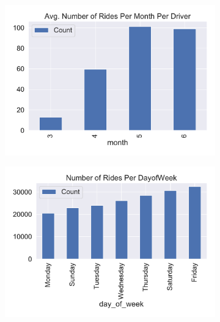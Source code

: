 \documentclass{report}
\begin{document}
			\begin{figure}[!htb]
				\centering
				\begin{subfigure}[t]{0.32\textwidth}
					\includegraphics[width=\linewidth]{timefactor_analysis/avg_number_rides_per_monthdriver.pdf}
					\caption{}
				\end{subfigure}
				\begin{subfigure}[t]{0.32\textwidth}
					\includegraphics[width=\linewidth]{timefactor_analysis/avg_number_rides_per_dayofweekdriver.pdf}
					\caption{}
				\end{subfigure}
				\begin{subfigure}[t]{0.32\textwidth}

\end{subfigure}
\end{figure}
\end{document}
